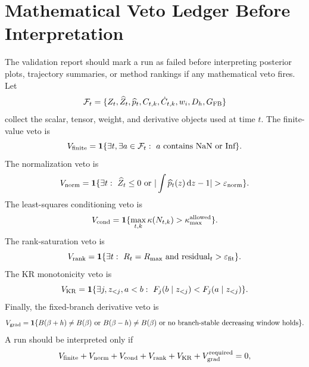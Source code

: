 \section{Mathematical Veto Ledger Before Interpretation}
\label{sec:bf-hd-validation-veto-ledger}

The validation report should mark a run as failed before interpreting posterior
plots, trajectory summaries, or method rankings if any mathematical veto fires.
Let
\begin{equation}
  \mathcal F_t=
  \{Z_t,\widehat Z_t,\widehat p_t,C_{t,k},\dot C_{t,k},w_i,D_h,G_{\rm FB}\}
  \label{eq:bf-hd-veto-ledger-objects}
\end{equation}
collect the scalar, tensor, weight, and derivative objects used at time \(t\).
The finite-value veto is
\begin{equation}
  V_{\rm finite}=
  \mathbf{1}\{\exists t,\exists a\in\mathcal F_t:\ a\text{ contains NaN or Inf}\}.
  \label{eq:bf-hd-veto-finite}
\end{equation}
The normalization veto is
\begin{equation}
  V_{\rm norm}=
  \mathbf{1}\{\exists t:\ \widehat Z_t\le0\ \text{or}\ |\int \widehat p_t(z)\dd z-1|>\varepsilon_{\rm norm}\}.
  \label{eq:bf-hd-veto-norm}
\end{equation}
The least-squares conditioning veto is
\begin{equation}
  V_{\rm cond}=
  \mathbf{1}\{\max_{t,k}\kappa(N_{t,k})>\kappa_{\rm max}^{\rm allowed}\}.
  \label{eq:bf-hd-veto-cond}
\end{equation}
The rank-saturation veto is
\begin{equation}
  V_{\rm rank}=
  \mathbf{1}\{\exists t:\ R_t=R_{\rm max}\ \text{and}\ {\rm residual}_t>\varepsilon_{\rm fit}\}.
  \label{eq:bf-hd-veto-rank}
\end{equation}
The KR monotonicity veto is
\begin{equation}
  V_{\rm KR}=
  \mathbf{1}\{\exists j,z_{<j},a<b:\ F_j(b\mid z_{<j})<F_j(a\mid z_{<j})\}.
  \label{eq:bf-hd-veto-kr}
\end{equation}
Finally, the fixed-branch derivative veto is
\begin{equation}
  V_{\rm grad}=
  \mathbf{1}\{B(\beta+h)\ne B(\beta)\ \text{or}\ B(\beta-h)\ne B(\beta)\ \text{or no branch-stable decreasing window holds}\}.
  \label{eq:bf-hd-veto-grad}
\end{equation}
A run should be interpreted only if
\begin{equation}
  V_{\rm finite}+V_{\rm norm}+V_{\rm cond}+V_{\rm rank}+V_{\rm KR}+V_{\rm grad}^{\rm required}=0,
  \label{eq:bf-hd-veto-sum-rule}
\end{equation}
